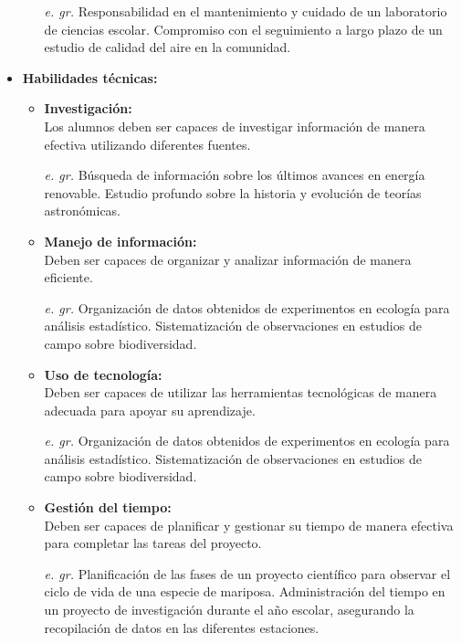 \begin{itemize}
\begin{itemize}
         \item[\textit{e. gr.}]
         Responsabilidad en el mantenimiento y cuidado de un laboratorio de ciencias escolar. Compromiso con el seguimiento a largo plazo de un estudio de calidad del aire en la comunidad.
    \end{itemize}
    \item \textbf{Habilidades técnicas:}
    \begin{itemize}
        \item \textbf{Investigación:}\\
        Los alumnos deben ser capaces de investigar información de manera efectiva utilizando diferentes fuentes.
        \item[\textit{e. gr.}]Búsqueda de información sobre los últimos avances en energía renovable. Estudio profundo sobre la historia y evolución de teorías astronómicas.
        \item \textbf{Manejo de información:}\\
         Deben ser capaces de organizar y analizar información de manera eficiente.
         \item[\textit{e. gr.}]Organización de datos obtenidos de experimentos en ecología para análisis estadístico. Sistematización de observaciones en estudios de campo sobre biodiversidad.
         \item \textbf{Uso de tecnología:}\\
         Deben ser capaces de utilizar las herramientas tecnológicas de manera adecuada para apoyar su aprendizaje.
         \item[\textit{e. gr.}] Organización de datos obtenidos de experimentos en ecología para análisis estadístico. Sistematización de observaciones en estudios de campo sobre biodiversidad.
         \item \textbf{Gestión del tiempo:}\\
         Deben ser capaces de planificar y gestionar su tiempo de manera efectiva para completar las tareas del proyecto.
         \item[\textit{e. gr.}]Planificación de las fases de un proyecto científico para observar el ciclo de vida de una especie de mariposa. Administración del tiempo en un proyecto de investigación durante el año escolar, asegurando la recopilación de datos en las diferentes estaciones.


\end{itemize}
\end{itemize}
